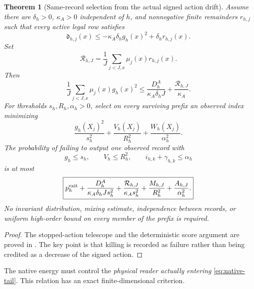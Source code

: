 \documentclass[11pt]{article}
\numberwithin{equation}{section}
\newtheorem{theorem}{Theorem}[section]
\theoremstyle{definition}
\theoremstyle{remark}
\begin{document}
\begin{theorem}[Same-record selection from the actual signed action drift]
\label{thm:source-selection}
Assume there are $\delta_h>0$, $\kappa_A>0$ independent of $h$, and nonnegative finite remainders $r_{h,j}$ such that every active legal row satisfies
\begin{equation}
 \mathfrak d_{h,j}(x)
 \le-\kappa_A\delta_h g_h(x)^2+\delta_h r_{h,j}(x).
 \label{eq:source-drift-ineq}
\end{equation}
Set
\begin{equation}
 \mathcal R_{h,J}=\frac1J\sum_{j<J,x}\mu_j(x)r_{h,j}(x).
 \label{eq:source-work-occupation}
\end{equation}
Then
\begin{equation}
 \frac1J\sum_{j<J,x}\mu_j(x)g_h(x)^2
 \le \frac{D_h^A}{\kappa_A\delta_hJ}
       +\frac{\mathcal R_{h,J}}{\kappa_A}.
 \label{eq:source-slope-occupation}
\end{equation}
For thresholds $s_h,R_h,\alpha_h>0$, select on every surviving prefix an observed index minimizing
\begin{equation}
 \frac{g_h(X_j)^2}{s_h^2}
 +\frac{V_h(X_j)}{R_h^2}
 +\frac{W_h(X_j)}{\alpha_h^2}.
 \label{eq:source-score}
\end{equation}
The probability of failing to output one observed record with
\begin{equation}
 g_h\le s_h,\qquad V_h\le R_h^2,\qquad
 i_{h,k}+\gamma_{h,k}\le\alpha_h
 \label{eq:source-selected}
\end{equation}
is at most
\begin{equation}
 \boxed{
 p_h^{\rm exit}
 +\frac{D_h^A}{\kappa_A\delta_hJ s_h^2}
 +\frac{\mathcal R_{h,J}}{\kappa_A s_h^2}
 +\frac{M_{h,J}}{R_h^2}
 +\frac{A_{h,J}}{\alpha_h^2}.}
 \label{eq:source-selection-failure}
\end{equation}
No invariant distribution, mixing estimate, independence between records, or uniform high-order bound on every member of the prefix is required.
\end{theorem}
\begin{proof}
The stopped-action telescope and the deterministic score argument are proved in .  The key point is that killing is recorded as failure rather than being credited as a decrease of the signed action.
\end{proof}

The native energy must control the \emph{physical reader actually entering} \eqref{eq:native-tail}.  This relation has an exact finite-dimensional criterion.
\end{document}
